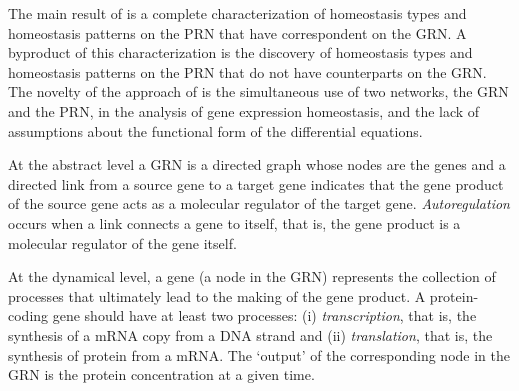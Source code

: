 \documentclass[a4paper,fleqn]{cas-dc}
\begin{document}
The main result of \cite{antoneli2023} is a complete characterization of homeostasis types and homeostasis patterns on the PRN that have correspondent on the GRN.
A byproduct of this characterization is the discovery of homeostasis types and homeostasis patterns on the PRN that do not have counterparts on the GRN.
The novelty of the approach of \cite{antoneli2023} is the simultaneous use of two networks, the GRN and the PRN, in the analysis of gene expression homeostasis, and the lack of assumptions about the functional form of the differential equations.


At the abstract level a GRN is a directed graph whose nodes are the genes and a directed link from a source gene to a target gene indicates that the gene product of the source gene acts as a molecular regulator of the target gene.
{\em Autoregulation} occurs when a link connects a gene to itself, that is, the gene product is a molecular regulator of the gene itself.

At the dynamical level, a gene (a node in the GRN) represents the collection of processes that ultimately lead to the making of the gene product.
A protein-coding gene should have at least two processes: (i) {\em transcription}, that is, the synthesis of a mRNA copy from a DNA strand and (ii) {\em translation}, that is, the synthesis of protein from a mRNA. 
The `output' of the corresponding node in the GRN is the protein concentration at a given time.
\end{document}
